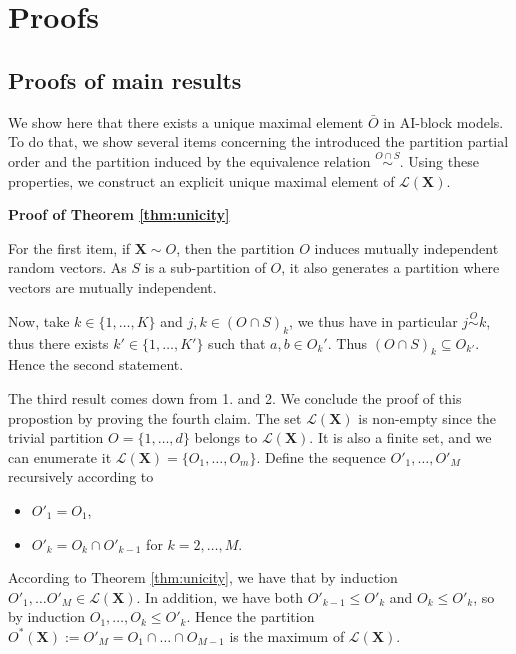 \documentclass[11pt]{article}
\makeatletter
\theoremstyle{definition}
\renewenvironment{proof}[1][\proofname]{\par
\pushQED{\qed}%
\normalfont \topsep6\p@\@plus6\p@\relax
\trivlist
\item\relax
{\textbf{
#1\@addpunct{ }}}\hspace\labelsep\ignorespaces
}{%
\popQED\endtrivlist\@endpefalse
}
\makeatother
\begin{document}
	
	
	
    
    
    \appendix
    \section{Proofs}
    \label{sec:proof}
        \subsection{Proofs of  main results}
        \label{subsec:main_results}
		We show here that there exists a unique maximal element $\bar{O}$ in AI-block models. To do that, we show several items concerning the introduced the partition partial order and the partition induced by the equivalence relation $\overset{O \cap S}{\sim}$. Using these properties, we construct an explicit unique maximal element of $\mathcal{L}(\textbf{X})$.
		\begin{proof}[Proof of Theorem \ref{thm:unicity}]
		For the first item, if $\textbf{X} \sim O$, then the partition $O$ induces mutually independent random vectors. As $S$ is a sub-partition of $O$, it also generates a partition where vectors are mutually independent.
		
		Now, take $k \in \{1,\dots,K\}$ and $j,k \in (O \cap S)_k$, we thus have in particular $j \overset{O}{\sim} k$, thus there exists $k' \in \{1,\dots, K'\}$ such that $a,b \in O_k'$. Thus $(O \cap S)_k \subseteq O_{k'}$. Hence the second statement.
		
		The third result comes down from 1. and 2. We conclude the proof of this propostion by proving the fourth claim. The set $\mathcal{L}(\textbf{X})$ is non-empty since the trivial partition $O = \{1,\dots,d\}$ belongs to $\mathcal{L}(\textbf{X})$. It is also a finite set, and we can enumerate it $\mathcal{L}(\textbf{X}) = \{O_1, \dots, O_m\}$. Define the sequence $O'_1, \dots, O'_M$ recursively according to
		\begin{itemize}
			\item $O'_1 = O_1$,
			\item $O'_k = O_k \cap O'_{k-1}$ for $k = 2,\dots, M$.
		\end{itemize}
		According to Theorem \ref{thm:unicity}, we have that by induction $O'_1, \dots O'_M \in \mathcal{L}(\textbf{X})$. In addition, we have both $O'_{k-1} \leq O'_k$ and $O_k \leq O'_k$, so by induction $O_1, \dots, O_k \leq O'_k$. Hence the partition $O^*(\textbf{X}) := O'_M = O_1 \cap \dots  \cap O_{M-1}$ is the maximum of $\mathcal{L}(\textbf{X})$.
	\end{proof}
	
\end{document}
